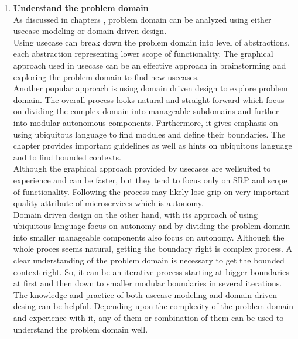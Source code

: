 \begin{enumerate}
\item \textbf{Understand the problem domain}\\
As discussed in chapters , problem domain can be analyzed using either usecase modeling or domain driven design. \\
Using usecase can break down the problem domain into level of abstractions, each abstraction representing lower scope of functionality. The graphical approach used in usecase can be an effective approach in brainstorming and exploring the problem domain to find new usecases.\\
Another popular approach is using domain driven design to explore problem domain. The overall process looks natural and straight forward which focus on dividing the complex domain into manageable subdomains and further into modular autonomous components. Furthermore, it gives emphasis on using ubiquitous language to find modules and define their boundaries. The chapter provides important guidelines as well as hints on ubiquitous language and to find bounded contexts.\\
Although the graphical approach provided by usecases are wellsuited to experience and can be faster, but they tend to focus only on \acrshort{SRP} and scope of functionality. Following the process may likely lose grip on very important quality attribute of microservices which is autonomy.\\
Domain driven design on the other hand, with its approach of using ubiquitous language focus on autonomy and by dividing the problem domain into smaller manageable components also focus on autonomy. Although the whole proces seems natural, getting the boundary right is complex process. A clear understanding of the problem domain is necessary to get the bounded context right. So, it can be an iterative process starting at bigger boundaries at first and then down to smaller modular boundaries in several iterations.\\
The knowledge and practice of both usecase modeling and domain driven desing can be helpful. Depending upon the complexity of the problem domain and experience with it, any of them or combination of them can be used to understand the problem domain well.


\end{enumerate}
